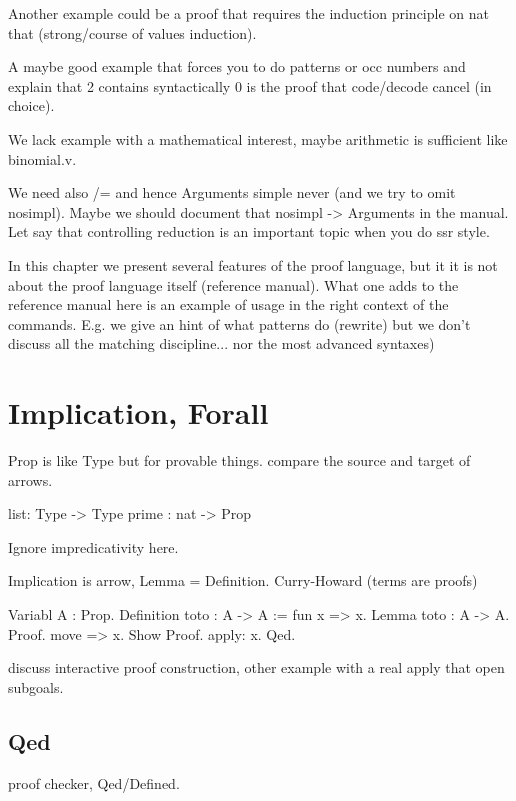 Another example could be a proof that requires the induction principle on nat that (strong/course of values induction).

A maybe good example that forces you to do patterns or occ numbers and explain
that 2  contains syntactically 0 is the proof that code/decode cancel (in
choice).

We lack example with a mathematical interest, maybe arithmetic is sufficient like binomial.v.

We need also /= and hence Arguments simple never (and we try to omit nosimpl).
Maybe we should document that nosimpl -> Arguments in the manual.
Let say that controlling reduction is an important topic when you
do ssr style.

In this chapter we present several features of the proof language, but it it is
not about the proof language itself (reference manual). What one adds to the
reference manual here is an example of usage in the right context of the
commands.  E.g. we give an hint of what patterns do (rewrite) but we don't
discuss all the matching discipline... nor the most advanced syntaxes)

\section{Implication, Forall}

Prop is like Type but for provable things. compare the source and target of
arrows.

\begin{coq}{}
list: Type -> Type
prime : nat -> Prop
\end{coq}

Ignore impredicativity here.

Implication is arrow, Lemma = Definition.
Curry-Howard (terms are proofs)

\begin{coq}{}
Variabl A : Prop.
Definition toto : A -> A := fun x => x.
Lemma  toto : A -> A.
 Proof.
  move => x.
  Show Proof.
  apply: x.
 Qed.
\end{coq}

discuss interactive proof construction, other example with a real 
apply that open subgoals.

\subsection{Qed}

proof checker, Qed/Defined.

